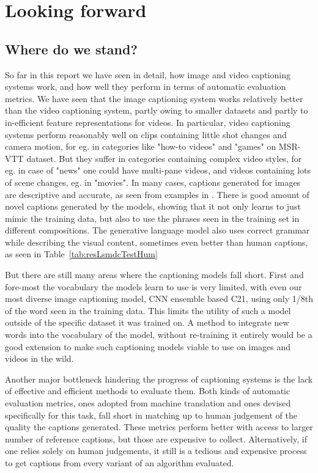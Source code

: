 \chapter{Looking forward}
\label{chapter:discussion}
\section{Where do we stand?}

So far in this report we have seen in detail, how image and video captioning
systems work, and how well they perform in terms of automatic evaluation
metrics.
We have seen that the image captioning system works relatively better than the
video captioning system, partly owing to smaller datasets and partly to
in-efficient feature representations for videos.
In particular, video captioning systems perform reasonably well on clips
containing little shot changes and camera motion, for eg. in categories like
"how-to videos" and "games" on MSR-VTT dataset.
But they suffer in categories containing complex video styles, for eg. in case
of "news" one could have multi-pane videos, and videos containing lots of scene
changes, eg. in "movies".
In many cases, captions generated for images are descriptive and accurate, as
seen from examples in .
There is good amount of novel captions generated by the models, showing that it
not only learns to just mimic the training data, but also to use the phrases
seen in the training set in different compositions.
The generative language model also uses correct grammar while describing the
visual content, sometimes even better than human captions, as seen in
Table~\ref{tab:resLsmdcTestHum}

But there are still many areas where the captioning models fall short.
First and fore-most the vocabulary the models learn to use is very limited,
with even our most diverse image captioning model, CNN ensemble based C21,
using only 1/8th of the word seen in the training data. 
This limits the utility of such a model outside of the specific dataset it was
trained on.
A method to integrate new words into the vocabulary of the model, without
re-training it entirely would be a good extension to make such captioning
models viable to use on images and videos in the wild.

Another major bottleneck hindering the progress of captioning systems is the
lack of effective and efficient methods to evaluate them.
Both kinds of automatic evaluation metrics, ones adopted from machine
translation and ones devised specifically for this task, fall short in matching
up to human judgement of the quality the captions generated.
These metrics perform better with access to larger number of reference
captions, but those are expensive to collect.
Alternatively, if one relies solely on human judgements, it still is a tedious
and expensive process to get captions from every variant of an algorithm
evaluated.

